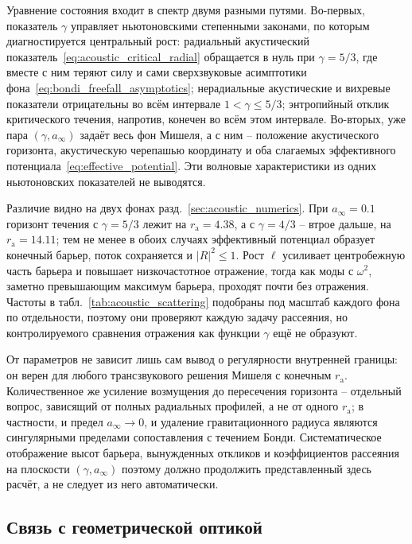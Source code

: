 \documentclass[12pt,a4paper,preprint,nopreprintline]{elsarticle}
\begin{document}
Уравнение состояния входит в спектр двумя разными путями. Во-первых, показатель $\gamma$ управляет ньютоновскими степенными законами, по которым диагностируется центральный рост: радиальный акустический показатель~\eqref{eq:acoustic_critical_radial} обращается в нуль при $\gamma=5/3$, где вместе с ним теряют силу и сами сверхзвуковые асимптотики фона~\eqref{eq:bondi_freefall_asymptotics}; нерадиальные акустические и вихревые показатели отрицательны во всём интервале $1<\gamma\leq5/3$; энтропийный отклик критического течения, напротив, конечен во всём этом интервале. Во-вторых, уже пара $(\gamma,a_{\infty})$ задаёт весь фон Мишеля, а с ним -- положение акустического горизонта, акустическую черепашью координату и оба слагаемых эффективного потенциала~\eqref{eq:effective_potential}. Эти волновые характеристики из одних ньютоновских показателей не выводятся.

Различие видно на двух фонах разд.~\ref{sec:acoustic_numerics}. При $a_{\infty}=0.1$ горизонт течения с $\gamma=5/3$ лежит на $r_{\mathrm{a}}=4.38$, а с $\gamma=4/3$ -- втрое дальше, на $r_{\mathrm{a}}=14.11$; тем не менее в обоих случаях эффективный потенциал образует конечный барьер, поток сохраняется и $|R|^{2}\leq1$. Рост $\ell$ усиливает центробежную часть барьера и повышает низкочастотное отражение, тогда как моды с $\omega^{2}$, заметно превышающим максимум барьера, проходят почти без отражения. Частоты в табл.~\ref{tab:acoustic_scattering} подобраны под масштаб каждого фона по отдельности, поэтому они проверяют каждую задачу рассеяния, но контролируемого сравнения отражения как функции $\gamma$ ещё не образуют.

От параметров не зависит лишь сам вывод о регулярности внутренней границы: он верен для любого трансзвукового решения Мишеля с конечным $r_{\mathrm{a}}$. Количественное же усиление возмущения до пересечения горизонта -- отдельный вопрос, зависящий от полных радиальных профилей, а не от одного $r_{\mathrm{a}}$; в частности, и предел $a_{\infty}\rightarrow0$, и удаление гравитационного радиуса являются сингулярными пределами сопоставления с течением Бонди. Систематическое отображение высот барьера, вынужденных откликов и коэффициентов рассеяния на плоскости $(\gamma,a_{\infty})$ поэтому должно продолжить представленный здесь расчёт, а не следует из него автоматически.

\subsection{Связь с геометрической оптикой}
\label{sec:geometric_optics_limit}
\end{document}
